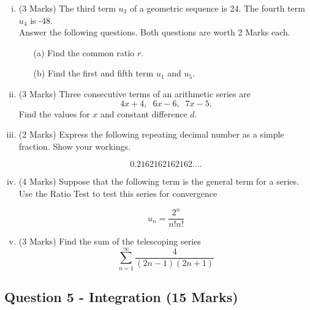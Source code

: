 \documentclass[a4paper,12pt]{article}
\begin{document}
\begin{enumerate}[(i)]
	\item (3 Marks)
	The third term $u_3$ of a geometric sequence is 24. The fourth term $u_4$ is -48. \\ \bigskip Answer the following questions. Both questions are worth 2 Marks each.
	\begin{itemize}
		\item[(a)] Find the common ratio $r$. 
		\item[(b)] Find the first and fifth term $u_1$ and $u_5$.
	\end{itemize}
	
	
	\bigskip
	
	\item (3 Marks)	Three consecutive terms of an arithmetic series are 
	\[4x+4,\;\;6x-6,\;\;7x-5.\]
	Find the values for $x$ and constant difference $d$.
	
		\bigskip
		
		\item (2 Marks) Express the following repeating decimal number as a simple fraction. Show your workings.
		
		\[0.2162162162162....\]
		
	\bigskip
	\item (4 Marks) Suppose that the following term is the general term for a series. Use the Ratio Test to test this series for convergence
	
	\[u_n=\frac{2^n}{n!n!}\]
	
	\bigskip
	
	\item (3 Marks) Find the sum of the telescoping series  \[ \sum^{\infty}_{n=1} \frac{4
		}{(2n-1)(2n+1)}\]
	

	\newpage

\end{enumerate}
\subsection*{Question 5 - Integration (15 Marks)}



\end{document}
